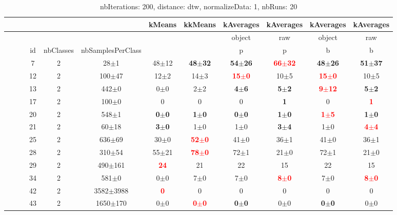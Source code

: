 \documentclass[12pt,a4paper,fleqn]{tufte-handout}
\begin{document}
 
\begin{table}     
\begin{center}     
\small     
\setlength{\tabcolsep}{.16667em}     
\begin{tabular}{lllccccccccc}     
&  &  &  &  &  & kMeans & kkMeans & kAverages & kAverages & kAverages & kAverages \\     
\hline     
&  &  &  &  &  &  &  & object & raw & object & raw \\     
&  &  & id & nbClasses & nbSamplesPerClass &  &  & p & p & b & b \\     
&  &  &  7 & 2 &      28$\pm$1 & 48$\pm$12 & \textbf{48$\pm$32} & \textbf{54$\pm$26} & \textbf{\textcolor{red}{66$\pm$32}} & \textbf{48$\pm$26} & \textbf{51$\pm$37} \\     
&  &  & 12 & 2 &    100$\pm$47 & 12$\pm$2 & 14$\pm$3 & \textbf{\textcolor{red}{15$\pm$0}} & 10$\pm$5 & \textbf{\textcolor{red}{15$\pm$0}} & 10$\pm$5 \\     
&  &  & 13 & 2 &     442$\pm$0 &  0$\pm$0 &  2$\pm$2 & \textbf{ 4$\pm$6} & \textbf{ 5$\pm$2} & \textbf{\textcolor{red}{9$\pm$12}} & \textbf{ 5$\pm$2} \\     
&  &  & 17 & 2 &     100$\pm$0 & 0 & 0 & 0 & \textbf{1} & 0 & \textbf{\textcolor{red}{1}} \\     
&  &  & 20 & 2 &     548$\pm$1 & \textbf{0$\pm$0} & \textbf{1$\pm$0} & \textbf{0$\pm$0} & \textbf{1$\pm$0} & \textbf{\textcolor{red}{1$\pm$5}} & \textbf{1$\pm$0} \\     
&  &  & 21 & 2 &     60$\pm$18 & \textbf{3$\pm$0} & 1$\pm$0 & 1$\pm$0 & \textbf{3$\pm$4} & 1$\pm$0 & \textbf{\textcolor{red}{4$\pm$4}} \\     
&  &  & 25 & 2 &    636$\pm$69 & 30$\pm$0 & \textbf{\textcolor{red}{52$\pm$0}} & 41$\pm$0 & 36$\pm$1 & 41$\pm$0 & 36$\pm$1 \\     
&  &  & 28 & 2 &    310$\pm$54 & 55$\pm$21 & \textbf{\textcolor{red}{ 78$\pm$0}} &  72$\pm$1 &  21$\pm$0 &  72$\pm$1 &  21$\pm$0 \\     
&  &  & 29 & 2 &   490$\pm$161 & \textbf{\textcolor{red}{24}} & 21 & 22 & 15 & 22 & 15 \\     
&  &  & 34 & 2 &     581$\pm$0 & 0$\pm$0 & 7$\pm$0 & 7$\pm$0 & \textbf{\textcolor{red}{8$\pm$0}} & 7$\pm$0 & \textbf{\textcolor{red}{8$\pm$0}} \\     
&  &  & 42 & 2 & 3582$\pm$3988 & \textbf{\textcolor{red}{0}} & 0 & 0 & 0 & 0 & 0 \\     
&  &  & 43 & 2 &  1650$\pm$170 & 0$\pm$0 & \textbf{\textcolor{red}{0$\pm$0}} & \textbf{0$\pm$0} & 0$\pm$0 & \textbf{0$\pm$0} & 0$\pm$0 \\     
\end{tabular}     
\end{center}     
\caption{nbIterations: 200, distance: dtw, normalizeData: 1, nbRuns: 20}     
\label{nbit200DidtNoda1Nbru20}     
\end{table}     
 
\end{document}
